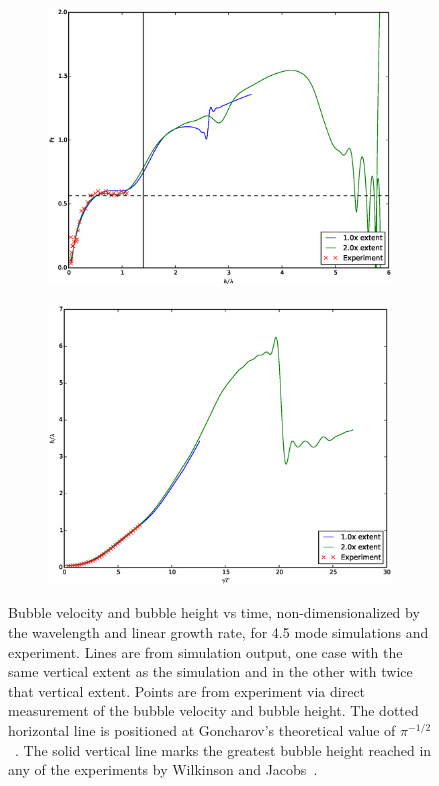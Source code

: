 \begin{figure}
\begin{subfigure}[b]{\columnwidth}
  \includegraphics[width=\columnwidth]{plts/Fr_long}
\end{subfigure}
\begin{subfigure}[b]{\columnwidth}
  \includegraphics[width=\columnwidth]{plts/aspect_long}
\end{subfigure}
\caption{ 
Bubble velocity and bubble height vs time, non-dimensionalized by the wavelength and linear growth rate, for 4.5 mode simulations and experiment.
Lines are from simulation output, one case with the same vertical extent as the simulation and in the other with twice that vertical extent.
Points are from experiment via direct measurement of the bubble velocity and bubble height.
The dotted horizontal line is positioned at Goncharov's theoretical value of $\pi^{-1/2}$~\cite{Goncharov2002}.
The solid vertical line marks the greatest bubble height reached in any of the experiments by Wilkinson and Jacobs~\cite{Wilkinson2007}.
}
\end{figure}

